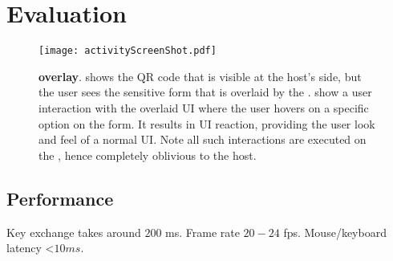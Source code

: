 \section{Evaluation}
\label{sec:eval}

\iffalse
\begin{figure}[t]
\centering
\texttt{[image: overlayScreenShot.pdf]}
\caption{\textbf{\name overlay}. }
\label{fig:screenshot_1}
\centering
\end{figure}
\fi



\begin{figure}[t]
\centering
\texttt{[image: activityScreenShot.pdf]}
\caption{\textbf{\name overlay}. \one shows the QR code that is visible at the host's side, but the user sees the sensitive form that is overlaid by the \device. \two show a user interaction with the overlaid UI where the user hovers on a specific option on the form. It results in UI reaction, providing the user look and feel of a normal UI. Note all such interactions are executed on the \device, hence completely oblivious to the host.}
\label{fig:screenshot_2}
\centering
\end{figure}


\subsection{Performance}

Key exchange takes around $200$ ms. Frame rate $20-24$ fps. Mouse/keyboard latency \textless$10ms$.